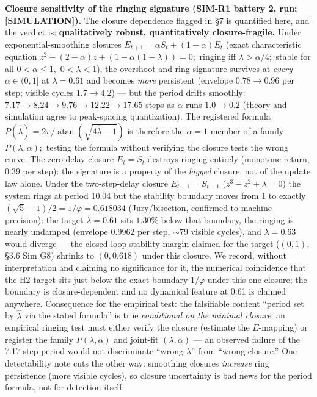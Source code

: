 \documentclass[11pt,twocolumn]{article}
\DeclareMathOperator{\atan}{atan}
\theoremstyle{gttdef}
\theoremstyle{gttplain}
\begin{document}
\textbf{Closure sensitivity of the ringing signature (SIM-R1 battery 2, run; [SIMULATION]).} The closure dependence flagged in \S{}7 is quantified here, and the verdict is: \textbf{qualitatively robust, quantitatively closure-fragile.} Under exponential-smoothing closures $E_{t+1} = \alpha S_t + (1-\alpha)E_t$ (exact characteristic equation $z^{2} - (2-\alpha)z + (1 - \alpha(1-\lambda)) = 0;$ ringing iff $\lambda > \alpha/4;$ stable for all $0 < \alpha \leq 1,$ $0 < \lambda < 1$), the overshoot-and-ring signature survives at \emph{every} $\alpha \in (0, 1]$ at $\lambda = 0.61$ and becomes \emph{more} persistent (envelope $0.78 \to 0.96$ per step; visible cycles $1.7 \to 4.2$) --- but the period drifts smoothly: $7.17 \to 8.24 \to 9.76 \to 12.22 \to 17.65$ steps as $\alpha$ runs $1.0 \to 0.2$ (theory and simulation agree to peak-spacing quantization). The registered formula $P(\hat{\lambda}) = 2\pi/\atan(\sqrt{4\hat{\lambda}-1})$ is therefore the $\alpha = 1$ member of a family $P(\lambda, \alpha);$ testing the formula without verifying the closure tests the wrong curve. The zero-delay closure $E_t = S_t$ destroys ringing entirely (monotone return, 0.39 per step): the signature is a property of the \emph{lagged} closure, not of the update law alone. Under the two-step-delay closure $E_{t+1} = S_{t-1}$ ($z^{3} - z^{2} + \lambda = 0$) the system rings at period 10.04 but the stability boundary moves from 1 to exactly $(\sqrt{5}-1)/2 = 1/\varphi = 0.618034$ (Jury/bisection, confirmed to machine precision): the target $\lambda = 0.61$ sits $1.30\%$ below that boundary, the ringing is nearly undamped (envelope 0.9962 per step, $\sim$79 visible cycles), and $\lambda = 0.63$ would diverge --- the closed-loop stability margin claimed for the target ($(0,1),$ \S{}3.6 Sim G8) shrinks to $(0, 0.618)$ under this closure. We record, without interpretation and claiming no significance for it, the numerical coincidence that the H2 target sits just below the exact boundary $1/\varphi$ under this one closure; the boundary is closure-dependent and no dynamical feature at 0.61 is claimed anywhere. Consequence for the empirical test: the falsifiable content ``period set by $\hat{\lambda}$ via the stated formula'' is true \emph{conditional on the minimal closure}; an empirical ringing test must either verify the closure (estimate the $E$-mapping) or register the family $P(\lambda, \alpha)$ and joint-fit $(\lambda, \alpha)$ --- an observed failure of the 7.17-step period would not discriminate ``wrong $\lambda$'' from ``wrong closure.'' One detectability note cuts the other way: smoothing closures \emph{increase} ring persistence (more visible cycles), so closure uncertainty is bad news for the period formula, not for detection itself.
\end{document}
